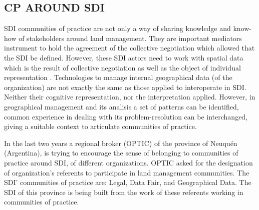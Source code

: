 \documentclass[10pt,twocolumn,ieeetran]{article}
\begin{document}

\subsection{CP AROUND SDI}


SDI communities of practice are not only a way of sharing knowledge and know-how of stakeholders around land management. They are important mediators instrument to hold the agreement of the collective negotiation which allowed that the SDI be defined. However, these SDI actors need to work with spatial data which is the result of collective negotiation as well as the object of individual representation \cite{Noucher1}. Technologies to manage internal geographical data (of the organization) are not exactly the same as those applied to interoperate in SDI. Neither their cognitive representation, nor the interpretation applied. However, in geographical management and its analisis a set of patterns can be identified, common experience in dealing with its problem-resolution can be interchanged, giving a suitable context to articulate communities of practice.  

In the last two years a regional broker (OPTIC) of the province of Neuqu\' en (Argentina), is trying to encourage the sense of belonging to communities of practice around SDI, of different organizations.
OPTIC asked for the designation of organization's referents to participate in land management communities. The SDI' communities of practice are: Legal, Data Fair, and Geographical Data. The SDI of this province is being built from the work of these referents working in communities of practice.
\end{document}
